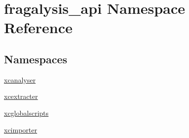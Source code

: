 \hypertarget{namespacefragalysis__api}{}\section{fragalysis\+\_\+api Namespace Reference}
\label{namespacefragalysis__api}
\subsection*{Namespaces}
\begin{DoxyCompactItemize}
\item 
 \hyperlink{namespacefragalysis__api_1_1xcanalyser}{xcanalyser}
\item 
 \hyperlink{namespacefragalysis__api_1_1xcextracter}{xcextracter}
\item 
 \hyperlink{namespacefragalysis__api_1_1xcglobalscripts}{xcglobalscripts}
\item 
 \hyperlink{namespacefragalysis__api_1_1xcimporter}{xcimporter}
\end{DoxyCompactItemize}
